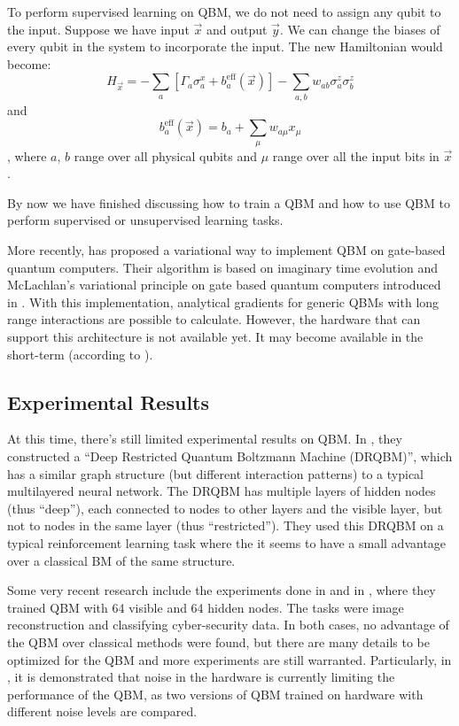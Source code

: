 \documentclass[letterpaper,11pt]{article}
\DeclareMathOperator{\eff}{eff}
\begin{document}
To perform supervised learning on QBM, we do not need to assign any qubit to the input. Suppose we have input $\vec{x}$ and output $\vec{y}$. We can change the biases of every qubit in the system to incorporate the input. The new Hamiltonian would become:
\begin{equation}
H_{\vec{x}} = - \sum_a [\Gamma_a \sigma_a^x + b_a^{\eff} (\vec{x})] - \sum_{a,b} w_{ab} \sigma_a^z \sigma_b^z
\end{equation} and 
\begin{equation}
b_a^{\eff} (\vec{x}) = b_a + \sum_{\mu} w_{a \mu} x_{\mu}
\end{equation}, where $a$, $b$ range over all physical qubits and $\mu$ range over all the input bits in $\vec{x}$. \par

By now we have finished discussing how to train a QBM and how to use QBM to perform supervised or unsupervised learning tasks. 

More recently, \cite{Zoufal_2021} has proposed a variational way to implement QBM on gate-based quantum computers. Their algorithm is based on imaginary time evolution and McLachlan's variational principle on gate based quantum computers introduced in \cite{VariationalQS}. With this implementation, analytical gradients for generic QBMs with long range interactions are possible to calculate. However, the hardware that can support this architecture is not available yet. It may become available in the short-term (according to \cite{Zoufal_2021}). 

\subsection{Experimental Results}

At this time, there's still limited experimental results on QBM. In \cite{reinforcement}, they constructed a ``Deep Restricted Quantum Boltzmann Machine (DRQBM)'', which has a similar graph structure (but different interaction patterns) to a typical multilayered neural network. The DRQBM has multiple layers of hidden nodes (thus ``deep''), each connected to nodes to other layers and the visible layer, but not to nodes in the same layer (thus ``restricted''). They used this DRQBM on a typical reinforcement learning task where the it seems to have a small advantage over a classical BM of the same structure. 

Some very recent research include the experiments done in \cite{TrainingRQBM} and in \cite{cyber}, where they trained QBM with 64 visible and 64 hidden nodes. The tasks were image reconstruction and classifying cyber-security data. In both cases, no advantage of the QBM over classical methods were found, but there are many details to be optimized for the QBM and more experiments are still warranted. Particularly, in \cite{TrainingRQBM}, it is demonstrated that noise in the hardware is currently limiting the performance of the QBM, as two versions of QBM trained on hardware with different noise levels are compared. \par
\end{document}
